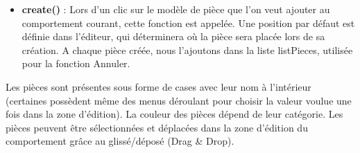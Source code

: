 \documentclass{report}
\begin{document}
\begin{enumerate}[label=\Alph*)]
\begin{itemize}
\item\textbf{create()} : Lors d'un clic sur le modèle de pièce que l'on veut ajouter au comportement courant, cette fonction est appelée. Une position par défaut est définie dans l'éditeur, qui déterminera où la pièce sera placée lors de sa création.\newline
A chaque pièce créée, nous l'ajoutons dans la liste listPieces, utilisée pour la fonction Annuler.
\end{itemize}

Les pièces sont présentes sous forme de cases avec leur nom à l'intérieur (certaines possèdent même des menus déroulant pour choisir la valeur voulue une fois dans la zone d'édition). La couleur des pièces dépend de leur catégorie.
Les pièces peuvent être sélectionnées et déplacées dans la zone d'édition du comportement grâce au glissé/déposé (Drag \& Drop).
\end{enumerate}
\end{document}
